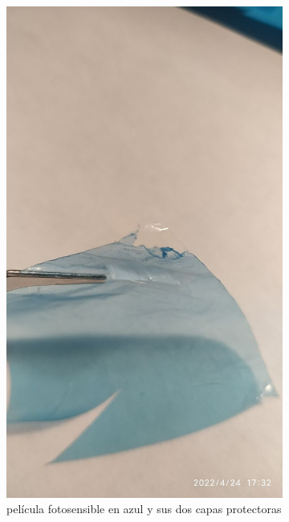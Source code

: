 \begin{figure}[!htb]
    \centering
    \begin{subfigure}[b]{.475\textwidth}
        \centering
        \includegraphics[width=1\textwidth, trim={0 400 0 400}, clip]{tfg/figuras/06_prototipado/explicacion/pelicula_seca_capas.png}
        \caption{película fotosensible en azul y sus dos capas protectoras}
        \label{fig:tfg:06:capas_pelicula}
    \end{subfigure}%
    \hfill
    \begin{subfigure}[b]{.475\textwidth}

\end{subfigure}
\end{figure}
